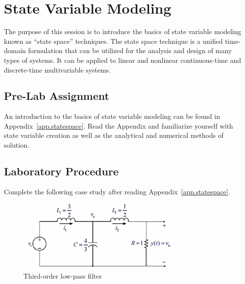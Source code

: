 

\chapter{State Variable Modeling} \label{ch.StaVar}

The purpose of this session is to introduce the basics of state variable modeling known as ``state space'' techniques.  The state space technique is a unified time-domain formulation that can be utilized for the analysis and design of many types of systems.  It can be applied to linear and nonlinear continuous-time and discrete-time multivariable systems.

\section{Pre-Lab Assignment}
An introduction to the basics of state variable modeling can be found in Appendix~\ref{app.statespace}.  Read the Appendix and familiarize yourself with state variable creation as well as the analytical and numerical methods of solution.

\section{Laboratory Procedure}
Complete the following case study after reading Appendix~\ref{app.statespace}.

\begin{figure}[hbt]
\centering
\includegraphics[width=3.4in]{thirdorderLPfilter}
\caption{\footnotesize
        Third-order low-pass filter
        \label{fig.statespacelab.thirdorderLPfilter}
        }
\end{figure}

